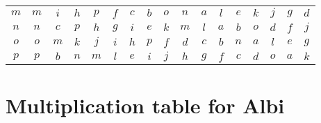 \documentclass[12pt]{amsart}
\begin{document}
\begin{center}
\begin{tabular}{c|cccccccccccccccc}
	\(m\)  & \(m\)  & \(i\)  & \(h\)  & \(p\)  & \(f\)  & \(c\)  & \(b\)  & \(o\)  & \(n\)  & \(a\)  & \(l\)  & \(e\)  & \(k\)  & \(j\)  & \(g\)  & \(d\)  \\
	\(n\)  & \(n\)  & \(c\)  & \(p\)  & \(h\)  & \(g\)  & \(i\)  & \(e\)  & \(k\)  & \(m\)  & \(l\)  & \(a\)  & \(b\)  & \(o\)  & \(d\)  & \(f\)  & \(j\)  \\
	\(o\)  & \(o\)  & \(m\)  & \(k\)  & \(j\)  & \(i\)  & \(h\)  & \(p\)  & \(f\)  & \(d\)  & \(c\)  & \(b\)  & \(n\)  & \(a\)  & \(l\)  & \(e\)  & \(g\)  \\
	\(p\)  & \(p\)  & \(b\)  & \(n\)  & \(m\)  & \(l\)  & \(e\)  & \(i\)  & \(j\)  & \(h\)  & \(g\)  & \(f\)  & \(c\)  & \(d\)  & \(o\)  & \(a\)  & \(k\)  
\end{tabular}\end{center}\clearpage

\section*{Multiplication table for Albi}
\end{document}

